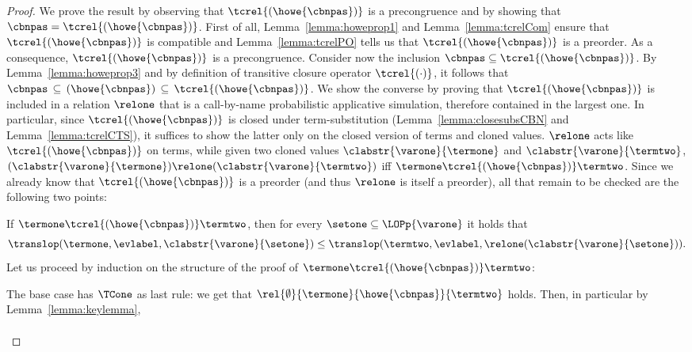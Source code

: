 \begin{proof}
  We prove the result by observing that $\tcrel{(\howe{\cbnpas})}$ is a
  precongruence and by showing that
  $\cbnpas=\tcrel{(\howe{\cbnpas})}$. First of all,
  Lemma~\ref{lemma:howeprop1} and Lemma~\ref{lemma:tcrelCom} ensure that
  $\tcrel{(\howe{\cbnpas})}$ is compatible and Lemma~\ref{lemma:tcrelPO}
  tells us that $\tcrel{(\howe{\cbnpas})}$ is a preorder. As a consequence,
  $\tcrel{(\howe{\cbnpas})}$ is a precongruence.  Consider now the
  inclusion $\cbnpas\subseteq\tcrel{(\howe{\cbnpas})}$.  By
  Lemma~\ref{lemma:howeprop3} and by definition of transitive closure
  operator $\tcrel{(\cdot)}$, it follows that
  $\cbnpas\,\subseteq\,(\howe{\cbnpas})\,\subseteq\,\tcrel{(\howe{\cbnpas})}$.
  We show the converse by proving that $\tcrel{(\howe{\cbnpas})}$ is
  included in a relation $\relone$ that is a call-by-name probabilistic
  applicative simulation, therefore contained in the largest one. In
  particular, since $\tcrel{(\howe{\cbnpas})}$ is closed under
  term-substitution (Lemma~\ref{lemma:closesubsCBN} and
  Lemma~\ref{lemma:tcrelCTS}), it suffices to show the latter only on the
  closed version of terms and cloned values. $\relone$ acts like
  $\tcrel{(\howe{\cbnpas})}$ on terms, while given two cloned values
  $\clabstr{\varone}{\termone}$ and $\clabstr{\varone}{\termtwo}$,
  $(\clabstr{\varone}{\termone})\relone(\clabstr{\varone}{\termtwo})$ iff
  $\termone\tcrel{(\howe{\cbnpas})}\termtwo$. Since we already know that
  $\tcrel{(\howe{\cbnpas})}$ is a preorder (and thus $\relone$ is itself a
  preorder), all that remain to be checked are the following two points:
  \begin{varitemize}
  \item If $\termone\tcrel{(\howe{\cbnpas})}\termtwo$, then for every
    $\setone\subseteq\LOPp{\varone}$ it holds that
    \begin{equation}\label{equ:probsimCBN}
      \translop(\termone,\evlabel,\clabstr{\varone}{\setone})\leq\translop(\termtwo,\evlabel,\relone(\clabstr{\varone}{\setone})).
    \end{equation}
    Let us proceed by induction on the structure of the proof of
    $\termone\tcrel{(\howe{\cbnpas})}\termtwo$:
    \begin{varitemize}
    \item The base case has $\TCone$ as last rule: we get that
      $\rel{\emptyset}{\termone}{\howe{\cbnpas}}{\termtwo}$ holds.  Then,
      in particular by Lemma~\ref{lemma:keylemma},
      \begin{align*}

\end{align*}
\end{varitemize}
\end{varitemize}
\end{proof}
